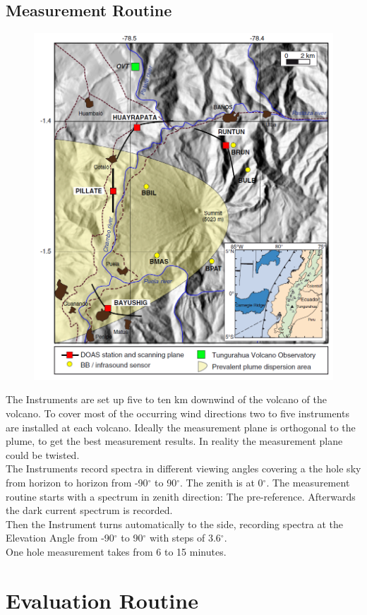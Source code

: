 \documentclass  [
  paper    = a4,
  BCOR     = 10mm,
  twoside,
  fontsize = 12pt,
  fleqn,
  toc      = bibnumbered,
  toc      = listofnumbered,
  numbers  = noendperiod,
  headings = normal,
  listof   = leveldown,
  version  = 3.03
]                                       {scrreprt}
\begin{document}
	
	\section{Measurement Routine}
	\begin{figure}[h]
		\centering
		\includegraphics[width=0.6\linewidth]{Bilder/Simon/Bilder_Tung/Map_Tungurahua2}
		\caption{}
		\label{fig:maptungurahua2}
	\end{figure}
	The Instruments are set up five to ten km downwind of the volcano of the volcano. To cover most of the occurring wind directions two to five instruments are installed at each volcano. Ideally the measurement plane is orthogonal to the plume, to get the best measurement results. In reality the measurement plane could be twisted.\\
	The Instruments record spectra in different viewing angles covering a the hole sky from horizon to horizon from 
	-90$^{\circ}$ to 90$^{\circ}$. The zenith is at 0$^{\circ}$.
	The measurement routine starts with a spectrum in zenith direction: The pre-reference.
	Afterwards the dark current spectrum is recorded.\\
	Then the Instrument turns automatically to the side, recording spectra at the Elevation Angle from -90$^{\circ}$ to 90$^{\circ}$ with steps of 3.6$^{\circ}$. \\
	One hole measurement takes from 6 to 15 minutes.

	
	\chapter{Evaluation Routine}
\end{document}
